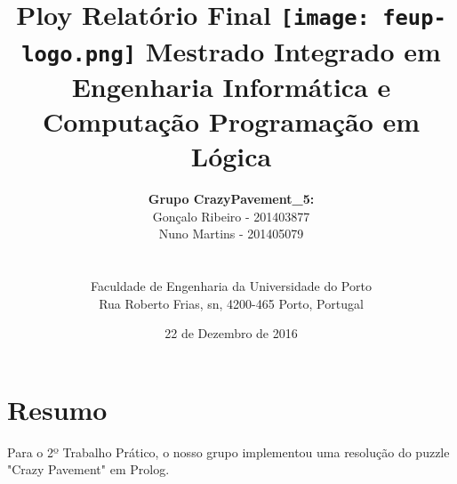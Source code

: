 \documentclass[a4paper]{article}
\begin{document}
\setlength{\textwidth}{16cm}
\setlength{\textheight}{22cm}

\title{\Huge\textbf{Ploy}\linebreak\linebreak\linebreak
\Large\textbf{Relatório Final}\linebreak\linebreak
\linebreak\linebreak
\texttt{[image: feup-logo.png]}\linebreak\linebreak
\linebreak\linebreak
\Large{Mestrado Integrado em Engenharia Informática e Computação} \linebreak\linebreak
\Large{Programação em Lógica}\linebreak
}

\author{\textbf{Grupo CrazyPavement\_5:}\\ Gonçalo Ribeiro - 201403877 \\ Nuno Martins - 201405079 \\\linebreak\linebreak \\
 \\ Faculdade de Engenharia da Universidade do Porto \\ Rua Roberto Frias, s\/n, 4200-465 Porto, Portugal \linebreak\linebreak\linebreak
\linebreak\linebreak\vspace{1cm}}
\date{22 de Dezembro de 2016}
\maketitle
\thispagestyle{empty}


\newpage

\section*{Resumo}
Para o 2º Trabalho Prático, o nosso grupo implementou uma resolução do puzzle "Crazy Pavement" em Prolog. 
\end{document}
